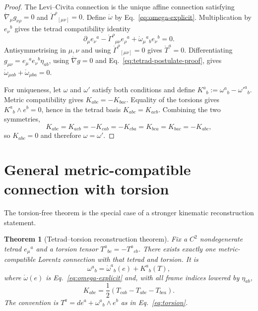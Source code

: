 \documentclass[12pt,a4paper]{article}
\newtheorem{theorem}[definition]{Theorem}
\theoremstyle{remark}\newtheorem{remark}[definition]{Remark}
\begin{document}
\begin{proof}
The Levi--Civita connection is the unique affine connection satisfying
$\mathring\nabla_\mu g_{\nu\rho}=0$ and
$\mathring\Gamma^\rho{}_{[\mu\nu]}=0$.  Define $\mathring\omega$ by
Eq.~\eqref{eq:omega-explicit}.  Multiplication by $e_\nu{}^b$ gives the tetrad
compatibility identity
\begin{equation}
 \partial_\mu e_\nu{}^a
 -\mathring\Gamma^\rho{}_{\mu\nu}e_\rho{}^a
 +\mathring\omega_\mu{}^a{}_b e_\nu{}^b=0.
 \label{eq:tetrad-postulate-proof}
\end{equation}
Antisymmetrising in $\mu,\nu$ and using
$\mathring\Gamma^\rho{}_{[\mu\nu]}=0$ gives $\mathring T^a=0$.
Differentiating $g_{\mu\nu}=e_\mu{}^a e_\nu{}^b\eta_{ab}$, using
$\mathring\nabla g=0$ and Eq.~\eqref{eq:tetrad-postulate-proof}, gives
$\mathring\omega_{\mu ab}+\mathring\omega_{\mu ba}=0$.

For uniqueness, let $\omega$ and $\omega'$ satisfy both conditions and define
$K^a{}_b:=\omega^a{}_b-\omega'^a{}_b$.  Metric compatibility gives
$K_{abc}=-K_{bac}$.  Equality of the torsions gives
$K^a{}_b\wedge e^b=0$, hence in the tetrad basis
$K_{abc}=K_{acb}$.  Combining the two symmetries,
\[
 K_{abc}=K_{acb}=-K_{cab}=-K_{cba}=K_{bca}=K_{bac}=-K_{abc},
\]
so $K_{abc}=0$ and therefore $\omega=\omega'$.
\end{proof}

\section{General metric-compatible connection with torsion}
The torsion-free theorem is the special case of a stronger kinematic
reconstruction statement.

\begin{theorem}[Tetrad--torsion reconstruction theorem]
\label{thm:tetrad-torsion}
Fix a $C^2$ nondegenerate tetrad $e_\mu{}^a$ and a torsion tensor
$T^a{}_{bc}=-T^a{}_{cb}$.  There exists exactly one metric-compatible Lorentz
connection with that tetrad and torsion.  It is
\begin{equation}
 \boxed{\omega^a{}_b=\mathring\omega^a{}_b(e)+K^a{}_b(T),}
 \label{eq:omega-decomp}
\end{equation}
where $\mathring\omega(e)$ is Eq.~\eqref{eq:omega-explicit} and, with all frame
indices lowered by $\eta_{ab}$,
\begin{equation}
 \boxed{
 K_{abc}=\frac12\left(T_{cab}-T_{abc}-T_{bca}\right).}
 \label{eq:contorsion-formula}
\end{equation}
The convention is $T^a=de^a+\omega^a{}_b\wedge e^b$ as in
Eq.~\eqref{eq:torsion}.
\end{theorem}
\end{document}
